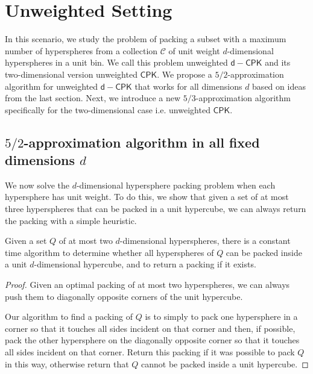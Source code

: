 \section{Unweighted Setting}
\label{sec:unweighted}

In this scenario, we study the problem of packing a subset with a maximum number of hyperspheres from a collection $\mathcal{C}$ of unit weight $d$-dimensional hyperspheres in a unit bin. We call this problem unweighted $\mathsf{d-CPK}$ and its two-dimensional version unweighted $\mathsf{CPK}$. We propose a $5/2$-approximation algorithm for unweighted $\mathsf{d-CPK}$ that works for all dimensions $d$ based on ideas from the last section. Next, we introduce a new  $5/3$-approximation algorithm specifically for the two-dimensional case i.e. unweighted $\mathsf{CPK}$.

\subsection{$5/2$-approximation algorithm in all fixed dimensions $d$}
We now solve the $d$-dimensional hypersphere packing problem when each hypersphere has unit weight. To do this, we show that given a set of at most three hyperspheres that can be packed in a unit hypercube, we can always return the packing with a simple heuristic. %
\begin{lemma}
	\label{twopack}
	Given a set $Q$ of at most two $d$-dimensional hyperspheres, there is a constant time algorithm to determine whether all hyperspheres of $Q$ can be packed inside a unit $d$-dimensional hypercube, and to return a packing if it exists. 
\end{lemma}
\begin{proof}
	Given an optimal packing of at most two hyperspheres, we can always push them to diagonally opposite corners of the unit hypercube.
	
	Our algorithm to find a packing of $Q$ is to simply to pack one hypersphere in a corner so that it touches all sides incident on that corner and then, if possible, pack the other hypersphere on the diagonally opposite corner so that it touches all sides incident on that corner. Return this packing if it was possible to pack $Q$ in this way, otherwise return that $Q$ cannot be packed inside a unit hypercube.
\end{proof}

